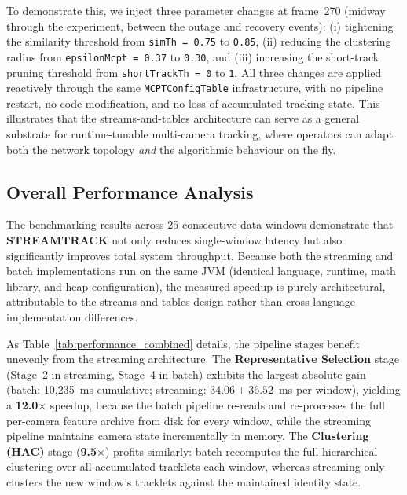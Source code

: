\documentclass[review]{elsarticle}
\begin{document}
To demonstrate this, we inject three parameter changes at frame~270 (midway through the experiment, between the outage and recovery events): (i) tightening the similarity threshold from \texttt{simTh = 0.75} to \texttt{0.85}, (ii) reducing the clustering radius from \texttt{epsilonMcpt = 0.37} to \texttt{0.30}, and (iii) increasing the short-track pruning threshold from \texttt{shortTrackTh = 0} to \texttt{1}. All three changes are applied reactively through the same \texttt{MCPTConfigTable} infrastructure, with no pipeline restart, no code modification, and no loss of accumulated tracking state. This illustrates that the streams-and-tables architecture can serve as a general substrate for runtime-tunable multi-camera tracking, where operators can adapt both the network topology \emph{and} the algorithmic behaviour on the fly.

\subsection{Overall Performance Analysis}
\label{sec:eval:overall}

The benchmarking results across 25 consecutive data windows demonstrate that \textbf{STREAMTRACK} not only reduces single-window latency but also significantly improves total system throughput. Because both the streaming and batch implementations run on the same JVM (identical language, runtime, math library, and heap configuration), the measured speedup is purely architectural, attributable to the streams-and-tables design rather than cross-language implementation differences.

As Table~\ref{tab:performance_combined} details, the pipeline stages benefit unevenly from the streaming architecture. The \textbf{Representative Selection} stage (Stage~2 in streaming, Stage~4 in batch) exhibits the largest absolute gain (batch: 10,235~ms cumulative; streaming: $34.06 \pm 36.52$~ms per window), yielding a \textbf{12.0$\times$} speedup, because the batch pipeline re-reads and re-processes the full per-camera feature archive from disk for every window, while the streaming pipeline maintains camera state incrementally in memory. The \textbf{Clustering (HAC)} stage (\textbf{9.5$\times$}) profits similarly: batch recomputes the full hierarchical clustering over all accumulated tracklets each window, whereas streaming only clusters the new window's tracklets against the maintained identity state.
\end{document}
